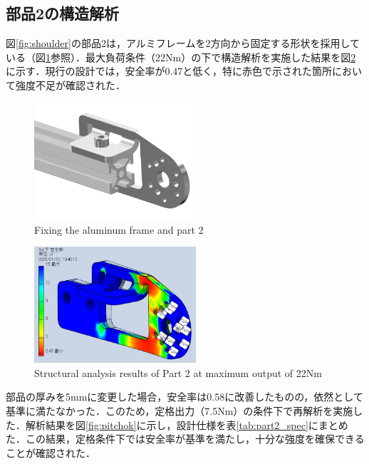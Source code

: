 \subsection{部品2の構造解析}
図\ref{fig:shoulder}の部品2は，アルミフレームを2方向から固定する形状を採用している（図\ref{fig:pitchalumi}参照）．最大負荷条件（22Nm）の下で構造解析を実施した結果を図\ref{fig:pitch}に示す．現行の設計では，安全率が0.47と低く，特に赤色で示された箇所において強度不足が確認された．

\begin{figure}[h]
  \centering
  \includegraphics[width=6cm]{images/design/pitchlink.png}
  \caption{Fixing the aluminum frame and part 2}
  \label{fig:pitchalumi}
\end{figure}

\begin{figure}[h]
  \centering
  \includegraphics[width=6cm]{images/design/pitch.png}
  \caption{Structural analysis results of Part 2 at maximum output of 22Nm}
  \label{fig:pitch}
\end{figure}

部品の厚みを5mmに変更した場合，安全率は0.58に改善したものの，依然として基準に満たなかった．このため，定格出力（7.5Nm）の条件下で再解析を実施した．解析結果を図\ref{fig:pitchok}に示し，設計仕様を表\ref{tab:part2_spec}にまとめた．この結果，定格条件下では安全率が基準を満たし，十分な強度を確保できることが確認された．

